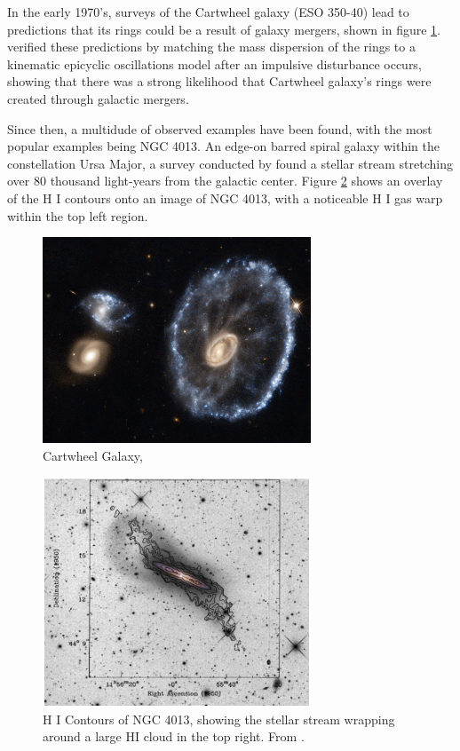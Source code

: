\documentclass[twocolumn]{article}
\begin{document}
In the early 1970's, surveys of the Cartwheel galaxy (ESO 350-40) lead to predictions that its rings could be a result of galaxy mergers, shown in figure \ref{fig:cartwheel}. \cite{lyndsAndToomre} verified these predictions by matching the mass dispersion of the rings to a kinematic epicyclic oscillations model after an impulsive disturbance occurs, showing that there was a strong likelihood that Cartwheel galaxy's rings were created through galactic mergers. 


Since then, a multidude of observed examples have been found, with the most popular examples being NGC 4013. An edge-on barred spiral galaxy within the constellation Ursa Major, a survey conducted by \cite{delgado} found a stellar stream stretching over 80 thousand light-years from the galactic center. Figure \ref{fig:ngc4013} shows an overlay of the H I contours onto an image of NGC 4013, with a noticeable H I gas warp within the top left region.

\begin{figure}
	\includegraphics[width=8cm]{cartwheel.jpg}

	\caption{Cartwheel Galaxy, \cite{cartwheel}}
	\label{fig:cartwheel}
\end{figure}

\begin{figure}
	\includegraphics[width=8cm]{h1Contours.png}
	\caption{H I Contours of NGC 4013, showing the stellar stream wrapping around a large HI cloud in the top right. From \cite{delgado}. }
	\label{fig:ngc4013}
\end{figure}
\end{document}
